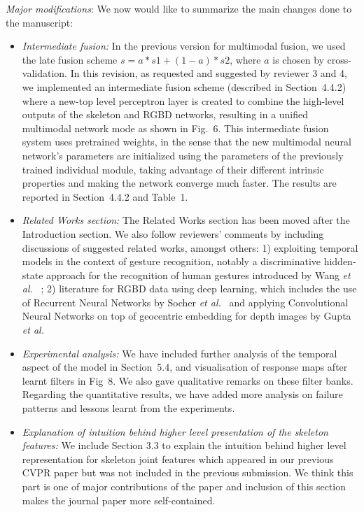 \documentclass[12pt]{article}
\begin{document}
{\noindent \em Major modifications}: We now would like to summarize the main changes done to the manuscript:

\begin{itemize}
\item {\em Intermediate fusion:} In the previous version for multimodal fusion, we used the late fusion scheme  $s = a * s1 + (1-a)*s2$, where $a$ is chosen by cross-validation. In this revision, as requested and suggested by reviewer 3 and 4, we implemented an intermediate fusion scheme (described in Section~4.4.2)
where a new-top level perceptron layer is created to combine the high-level outputs of the skeleton and RGBD networks, 
resulting in a unified  multimodal network mode as shown in Fig.~6. 
%
This intermediate fusion system uses pretrained weights, 
in the sense that the new multimodal neural network's parameters 
are initialized using the parameters of the  previously trained individual module, 
taking advantage of their different  intrinsic properties and making the network converge much faster. 
The results are reported in  Section~4.4.2 and Table~1.

\item {\em Related Works section:} The Related Works section has been moved after the Introduction section. We also follow reviewers' comments by  including discussions of suggested related works, amongst others: 1) exploiting temporal models in the context of gesture recognition, notably a discriminative hidden-state approach for the recognition of human gestures introduced by Wang \emph{et al.}~\cite{wang2006hidden} ; 2) literature for RGBD data using deep learning, which includes the use of Recurrent Neural Networks by Socher \emph{et al.}~\cite{socher2012convolutional} and applying Convolutional Neural Networks on top of geocentric embedding for depth images by Gupta \emph{et al.}~\cite{gupta2014learning}

\item {\em Experimental analysis:} We have included further analysis of the temporal aspect of the model 
in Section~5.4, and visualisation of response maps after learnt filters in Fig~8. We also gave qualitative remarks on these filter banks. Regarding the quantitative results, we have added more analysis on failure patterns and lessons learnt from the experiments.

\item {\em Explanation of intuition behind higher level presentation of the skeleton features:} We include Section 3.3 to explain the intuition behind higher level representation  for skeleton joint features which appeared in our previous CVPR paper but was not included in the previous submission. We think this part is one of major contributions of the paper and inclusion of this section makes the journal paper more self-contained.
\end{itemize}
\end{document}
